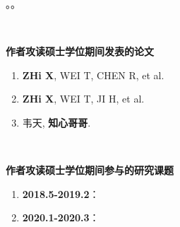 
。。

~~

\begin{flushleft} 
  \bfseries\large 作者攻读硕士学位期间发表的论文\\
  \relax
\end{flushleft}

\begin{enumerate}
  \renewcommand{\labelenumi}{[\theenumi].}
  \item \textbf{ZHi X}, WEI T, CHEN R, et al.   \item \textbf{ZHi X}, WEI T, JI H, et al.  \item 韦天, \textbf{知心哥哥}. 
\end{enumerate}

~~

\begin{flushleft}
  \bfseries\large 作者攻读硕士学位期间参与的研究课题\\
  \relax
\end{flushleft}

\begin{enumerate}
  \renewcommand{\labelenumi}{[\theenumi].}
  \item \textbf{2018.5-2019.2}：
  \item \textbf{2020.1-2020.3}：
\end{enumerate}
